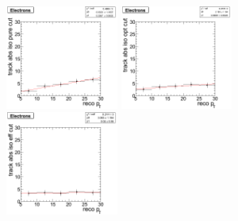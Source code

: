 \clearpage

\begin{figure}[htbp]
   \includegraphics[width = 0.33\textwidth]{pictures/optIsoCut/trackIso_elec_pure.png}
   \includegraphics[width = 0.33\textwidth]{pictures/optIsoCut/trackIso_elec_opt.png}
   \includegraphics[width = 0.33\textwidth]{pictures/optIsoCut/trackIso_elec_eff.png}
   \label{fig:optTrackIso_elec}
\end{figure}

